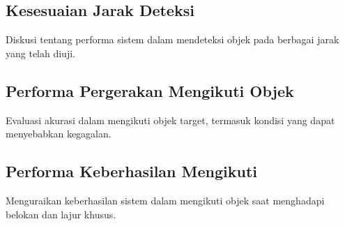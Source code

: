 \subsection{Kesesuaian Jarak Deteksi}
\label{sec:kesesuaianjarak}

Diskusi tentang performa sistem dalam mendeteksi objek pada berbagai jarak yang telah diuji.

\subsection{Performa Pergerakan Mengikuti Objek}
\label{sec:akurasiikutiobjek}

Evaluasi akurasi dalam mengikuti objek target, termasuk kondisi yang dapat menyebabkan kegagalan.

\subsection{Performa Keberhasilan Mengikuti}
\label{sec:keberhasilanmengikuti}

Menguraikan keberhasilan sistem dalam mengikuti objek saat menghadapi belokan dan lajur khusus.